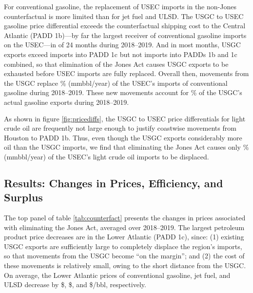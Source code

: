 \documentclass[12pt]{article}
\begin{document}
For conventional gasoline, the replacement of USEC imports in the non-Jones counterfactual is more limited than for jet fuel and ULSD. The USGC to USEC gasoline price differential exceeds the counterfactual shipping cost to the Central Atlantic (PADD 1b)---by far the largest receiver of conventional gasoline imports on the USEC---in of 24 months during 2018--2019. And in most months, USGC exports exceed imports into PADD 1c but not imports into PADDs 1b and 1c combined, so that elimination of the Jones Act causes USGC exports to be exhausted before USEC imports are fully replaced. Overall then, movements from the USGC replace \unskip\% (mmbbl/year) of the USEC's imports of conventional gasoline during 2018--2019. These new movements account for \unskip\% of the USGC's actual gasoline exports during 2018--2019.

As shown in figure \ref{fig:pricediffs}, the USGC to USEC price differentials for light crude oil are frequently not large enough to justify coastwise movements from Houston to PADD 1b. Thus, even though the USGC exports considerably more oil than the USGC imports, we find that eliminating the Jones Act causes only \unskip\% (mmbbl/year) of the USEC's light crude oil imports to be displaced.



\subsection{Results: Changes in Prices, Efficiency, and Surplus} \label{sec:Count_results_surplus}

The top panel of table \ref{tab:counterfact} presents the changes in prices associated with eliminating the Jones Act, averaged over 2018--2019. The largest petroleum product price decreases are in the Lower Atlantic (PADD 1c), since: (1) existing USGC exports are sufficiently large to completely displace the region's imports, so that movements from the USGC become ``on the margin''; and (2) the cost of these movements is relatively small, owing to the short distance from the USGC. On average, the Lower Atlantic prices of conventional gasoline, jet fuel, and ULSD decrease by \$\unskip, \$\unskip, and \$\unskip/bbl, respectively.
\end{document}
